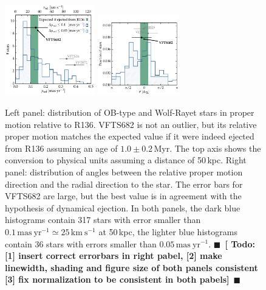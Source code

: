 \documentclass[apjl,twocolumn]{emulateapj}
\newcommand{\todo}[1]{{\large $\blacksquare$~\textbf{\color{red}[#1]}}~$\blacksquare$}
\begin{document}
\begin{figure}[htbp]
  \centering
  \includegraphics[width=0.35\textwidth]{figures/dist_mu_region.pdf}
  \includegraphics[width=0.315\textwidth]{figures/angle_dist}
  \caption{Left panel: distribution of OB-type and Wolf-Rayet stars in proper
    motion relative to R136. VFTS682 is not an outlier, but
    its relative proper motion matches the expected value if it were indeed
    ejected from R136 assuming an age of $1.0\pm0.2$\,Myr. The top axis shows the conversion to physical units
    assuming a distance of 50\,kpc. Right panel:  distribution of
    angles between the relative proper motion direction and the radial
    direction to the star. The error bars for VFTS682 are large, but
    the best value is in agreement with the hypothesis of dynamical
    ejection. In both
    panels, the dark blue histograms contain 317 
    stars with error smaller than $0.1\,\mathrm{mas \
      yr^{-1}}\simeq25\,\mathrm{km\ s^{-1}}$ at 50\,kpc, the
    lighter blue histograms contain 36 stars with errors smaller than $0.05\,\mathrm{mas \
      yr^{-1}}$. \todo{ Todo: [1] insert correct errorbars in right pabel, [2] make linewidth, shading and figure size of both panels consistent [3] fix normalization to be consistent in both pabels}}
  \label{fig:mu_dist}
\end{figure}

\end{document}
